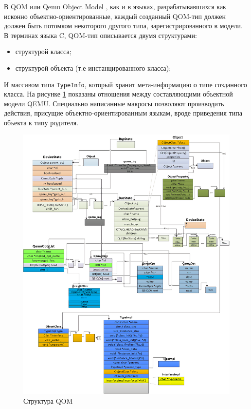 В QOM или Qemu Object Model \cite{qom-talking}, как и в языках, разрабатывавшихся как исконно объектно-ориентированные,
каждый созданный QOM-тип должен должен быть потомком некоторого другого типа, зарегистрированного в модели.
В терминах языка C, QOM-тип описывается двумя структурами:
\begin{itemize}
    \item структурой класса;
    \item структурой объекта (т.е инстанцированного класса);
\end{itemize}
И массивом типа \texttt{TypeInfo}, который хранит мета-информацию о типе созданного класса.
На рисунке \ref{fig:qom-structure} показаны отношения между составляющими объектной модели QEMU.
Специально написанные макросы позволяют производить действия, присущие объектно-ориентированным
языкам, вроде приведения типа объекта к типу родителя.

\begin{figure}[!htbp]
    \centering
    \begin{adjustbox}{max totalsize={0.8\textwidth}{\textheight}}
        \includegraphics[]{images/qom-hierarchy_upscaled.png}
    \end{adjustbox}
    \caption{Структура QOM}\label{fig:qom-structure}
\end{figure}


